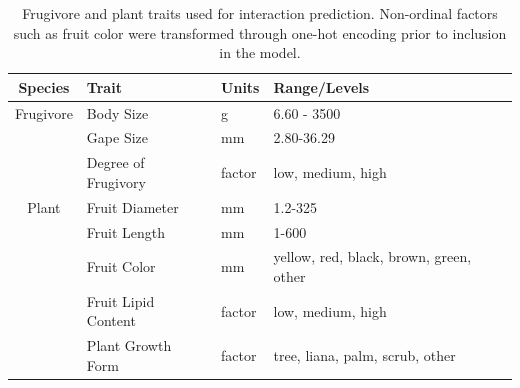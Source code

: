 \begin{table}[!h]
\caption{Frugivore and plant traits used for interaction prediction. Non-ordinal factors such as fruit color were transformed through one-hot encoding prior to inclusion in the model.}
\label{tab:traits}
\begin{tabular}{clll} 
 \hline
 Species & Trait & Units & Range/Levels \\  
 \hline
 \hline
Frugivore & Body Size &  g &  6.60 - 3500 \\
& Gape Size &   mm  & 2.80-36.29  \\  
& Degree of Frugivory & factor   &  low, medium, high \\  
Plant & Fruit Diameter &  mm  & 1.2-325  \\
& Fruit Length &  mm  &  1-600 \\
& Fruit Color &  mm  & yellow, red, black, brown, green, other \\
& Fruit Lipid Content & factor   &  low, medium, high  \\ 
& Plant Growth Form &   factor  &  tree, liana, palm, scrub, other \\ 
 \hline
\end{tabular}
\end{table}


\clearpage 


